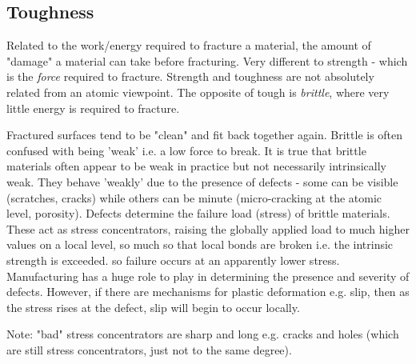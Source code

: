 \documentclass[class=report, crop=false, 12pt,a4paper]{standalone}
\begin{document}
\subsection{Toughness}
Related to the work/energy required to fracture a material, the amount of "damage" a material can take before fracturing. Very different to strength - which is the \emph{force} required to fracture. Strength and toughness are not absolutely related from an atomic viewpoint. The opposite of tough is \emph{brittle}, where very little energy is required to fracture. 

Fractured surfaces tend to be "clean" and fit back together again. Brittle is often confused with being 'weak' i.e. a low force to break. It is true that brittle materials often appear to be weak in practice but not necessarily intrinsically weak. They behave 'weakly' due to the presence of defects - some can be visible (scratches, cracks) while others can be minute (micro-cracking at the atomic level, porosity). Defects determine the failure load (stress) of brittle materials. These act as stress concentrators, raising the globally applied load to much higher values on a local level, so much so that local bonds are broken i.e. the intrinsic strength is exceeded. so failure occurs at an apparently lower stress. Manufacturing has a huge role to play in determining the presence and severity of defects. However, if there are mechanisms for plastic deformation e.g. slip, then as the stress rises at the defect, slip will begin to occur locally.

Note: "bad" stress concentrators are sharp and long e.g. cracks and holes (which are still stress concentrators, just not to the same degree).
\end{document}
